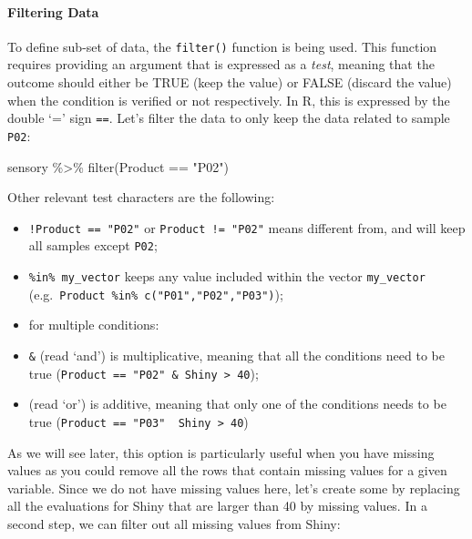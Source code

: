 \documentclass[
]{book}
\newenvironment{Shaded}{\begin{snugshade}}{\end{snugshade}}
\newcommand{\FunctionTok}[1]{\textcolor[rgb]{0.00,0.00,0.00}{#1}}
\newcommand{\NormalTok}[1]{#1}
\newcommand{\SpecialCharTok}[1]{\textcolor[rgb]{0.00,0.00,0.00}{#1}}
\newcommand{\StringTok}[1]{\textcolor[rgb]{0.31,0.60,0.02}{#1}}
\providecommand{\tightlist}{%
  \setlength{\itemsep}{0pt}\setlength{\parskip}{0pt}}
\begin{document}
\hypertarget{filtering-data}{%
\paragraph{Filtering Data}\label{filtering-data}}

To define sub-set of data, the \texttt{filter()} function is being used. This function requires providing an argument that is expressed as a \emph{test}, meaning that the outcome should either be TRUE (keep the value) or FALSE (discard the value) when the condition is verified or not respectively. In R, this is expressed by the double `=' sign \texttt{==}. Let's filter the data to only keep the data related to sample \texttt{P02}:

\begin{Shaded}
\begin{Highlighting}[]
\NormalTok{sensory }\SpecialCharTok{\%\textgreater{}\%} 
  \FunctionTok{filter}\NormalTok{(Product }\SpecialCharTok{==} \StringTok{"P02"}\NormalTok{)}
\end{Highlighting}
\end{Shaded}

Other relevant test characters are the following:

\begin{itemize}
\tightlist
\item
  \texttt{!Product\ ==\ "P02"} or \texttt{Product\ !=\ "P02"} means different from, and will keep all samples except \texttt{P02};
\item
  \texttt{\%in\%\ my\_vector} keeps any value included within the vector \texttt{my\_vector} (e.g.~\texttt{Product\ \%in\%\ c("P01","P02","P03")});
\item
  for multiple conditions:
\item
  \texttt{\&} (read `and') is multiplicative, meaning that all the conditions need to be true (\texttt{Product\ ==\ "P02"\ \&\ Shiny\ \textgreater{}\ 40});
\item
  \texttt{\textbar{}} (read `or') is additive, meaning that only one of the conditions needs to be true (\texttt{Product\ ==\ "P03"\ \textbar{}\ Shiny\ \textgreater{}\ 40})
\end{itemize}

As we will see later, this option is particularly useful when you have missing values as you could remove all the rows that contain missing values for a given variable. Since we do not have missing values here, let's create some by replacing all the evaluations for Shiny that are larger than 40 by missing values. In a second step, we can filter out all missing values from Shiny:
\end{document}
